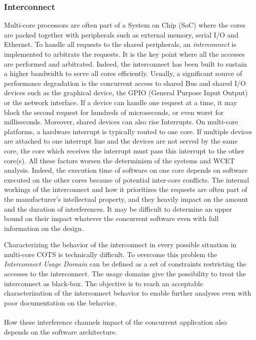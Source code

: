 \subsubsection{Interconnect}
Multi-core processors are often part of a System on Chip (SoC) where the cores are packed together with peripherals such as external memory, serial I/O and Ethernet. To handle all requests to the shared peripherals, an \emph{interconnect} is implemented to arbitrate the requests. It is the key point where all the accesses are performed and arbitrated. Indeed, the interconnect has been built to sustain a higher bandwidth to serve all cores efficiently. Usually, a significant source of performance degradation is the concurrent access to shared Bus and shared I/O devices such as the graphical device, the GPIO (General Purpose Input Output) or the network interface. If a device can handle one request at a time, it may block the second request for hundreds of microseconds, or even worst for milliseconds. Moreover, shared devices can also rise Interrupts. On multi-core platforms, a hardware interrupt is typically routed to one core. If multiple devices are attached to one interrupt line and the devices are not served by the same core, the core which receives the interrupt must pass this interrupt to the other core(s). All these factors worsen the determinism of the systems and WCET analysis. Indeed, the execution time of software on one core depends on software executed on the other cores because of potential inter-core conflicts. The internal workings of the interconnect and how it prioritizes the requests are often part of the manufacturer's intellectual property, and they heavily impact on the amount and the duration of interferences. It may be difficult to determine an upper bound on their impact whatever the concurrent software even with full information on the design.
\par Characterizing the behavior of the interconnect in every possible situation in multi-core COTS is technically difficult. To overcome this problem the \emph{Interconnect Usage Domain} can be defined as a set of constraints restricting the accesses to the interconnect. The usage domains give the possibility to treat the interconnect as black-box. The objective is to reach an acceptable characterization of the interconnect behavior to enable further analyses even with poor documentation on the behavior.

\paragraph{} How these interference channels impact of the concurrent application also depends on the software architecture.

